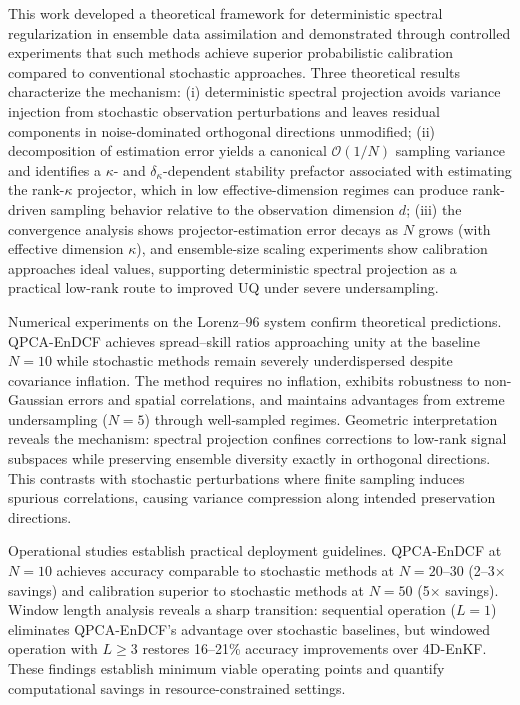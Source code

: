 \documentclass[11pt,a4paper]{article}
\begin{document}
This work developed a theoretical framework for deterministic spectral regularization in ensemble data assimilation and demonstrated through controlled experiments that such methods achieve superior probabilistic calibration compared to conventional stochastic approaches. Three theoretical results characterize the mechanism: (i) deterministic spectral projection avoids variance injection from stochastic observation perturbations and leaves residual components in noise-dominated orthogonal directions unmodified; (ii) decomposition of estimation error yields a canonical $\mathcal{O}(1/N)$ sampling variance and identifies a $\kappa$- and $\delta_\kappa$-dependent stability prefactor associated with estimating the rank-$\kappa$ projector, which in low effective-dimension regimes can produce rank-driven sampling behavior relative to the observation dimension $d$; 
(iii) the convergence analysis shows projector-estimation error decays as $N$ grows (with effective dimension $\kappa$), and ensemble-size scaling experiments show calibration approaches ideal values, supporting deterministic spectral projection as a practical low-rank route to improved UQ under severe undersampling.

Numerical experiments on the Lorenz--96 system confirm theoretical predictions. QPCA-EnDCF achieves spread--skill ratios approaching unity at the baseline $N=10$ while stochastic methods remain severely underdispersed despite covariance inflation. The method requires no inflation, exhibits robustness to non-Gaussian errors and spatial correlations, and maintains advantages from extreme undersampling ($N = 5$) through well-sampled regimes. Geometric interpretation reveals the mechanism: spectral projection confines corrections to low-rank signal subspaces while preserving ensemble diversity exactly in orthogonal directions. This contrasts with stochastic perturbations where finite sampling induces spurious correlations, causing variance compression along intended preservation directions.

Operational studies establish practical deployment guidelines. 
QPCA-EnDCF at $N = 10$ achieves accuracy comparable to stochastic methods at $N = 20$--$30$ (2--3$\times$ savings) and calibration superior to stochastic methods at $N = 50$ (5$\times$ savings). 
Window length analysis reveals a sharp transition: sequential operation ($L = 1$) eliminates QPCA-EnDCF's advantage over stochastic baselines, but windowed operation with $L \geq 3$ restores 16--21\% accuracy improvements over 4D-EnKF. These findings establish minimum viable operating points and quantify computational savings in resource-constrained settings.
\end{document}

